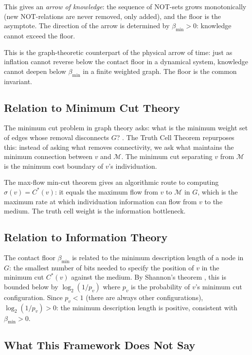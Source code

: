 \documentclass[12pt, a4paper]{article}
\theoremstyle{plain}
\theoremstyle{definition}
\theoremstyle{remark}
\newcommand{\med}{\mathcal{M}}
\newcommand{\bmin}{\beta_{\min}}
\begin{document}
This gives an \emph{arrow of knowledge}: the sequence of NOT-sets grows
monotonically (new NOT-relations are never removed, only added), and the
floor is the asymptote. The direction of the arrow is determined by
$\bmin > 0$: knowledge cannot exceed the floor.

This is the graph-theoretic counterpart of the physical arrow of time:
just as inflation cannot reverse below the contact floor in a dynamical
system, knowledge cannot deepen below $\bmin$ in a finite weighted graph.
The floor is the common invariant.

\subsection{Relation to Minimum Cut Theory}

The minimum cut problem in graph theory asks: what is the minimum weight
set of edges whose removal disconnects $G$? \citep{ford1956maxflow,
stoer1997simple}. The Truth Cell Theorem repurposes this: instead of
asking what removes connectivity, we ask what maintains the minimum
connection between $v$ and $\med$. The minimum cut separating $v$ from
$\med$ is the minimum cost boundary of $v$'s individuation.

The max-flow min-cut theorem \citep{ford1956maxflow} gives an algorithmic
route to computing $\sigma(v) = C^*(v)$: it equals the maximum flow from
$v$ to $\med$ in $G$, which is the maximum rate at which individuation
information can flow from $v$ to the medium. The truth cell weight is the
information bottleneck.

\subsection{Relation to Information Theory}

The contact floor $\bmin$ is related to the minimum description length of
a node in $G$: the smallest number of bits needed to specify the position
of $v$ in the minimum cut $C^*(v)$ against the medium. By Shannon's theorem
\citep{shannon1948mathematical}, this is bounded below by $\log_2(1/p_v)$
where $p_v$ is the probability of $v$'s minimum cut configuration. Since
$p_v < 1$ (there are always other configurations), $\log_2(1/p_v) > 0$:
the minimum description length is positive, consistent with $\bmin > 0$.

\subsection{What This Framework Does Not Say}
\end{document}
